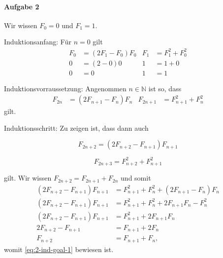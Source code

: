 \documentclass{article}
\begin{document}
\paragraph{Aufgabe 2}

Wir wissen $F_0 = 0$ und $F_1 = 1$.

Induktionsanfang: Für $n = 0$ gilt
\begin{align*}
    F_0 &= (2F_1 - F_0)F_0     & F_1 &= F^{2}_{1} + F^{2}_{0} \\
    0 &= (2 - 0)0              & 1 &= 1 + 0 \\
    0 &= 0                     & 1 &= 1
\end{align*}

Induktionsvorraussetzung: Angenommen $n \in \mathbb{N}$ ist so, dass
\begin{align*}
    F_{2n} &= (2F_{n + 1} - F_n)F_n & F_{2n + 1} &= F^{2}_{n + 1} + F^{2}_{n}
\end{align*}
gilt.

Induktionsschritt: Zu zeigen ist, dass dann auch

\begin{minipage}{.49\linewidth}
    \begin{equation}\label{eq:2-ind-goal-1}
        F_{2n + 2} = (2F_{n + 2} - F_{n + 1})F_{n + 1}
    \end{equation}
\end{minipage}%
\begin{minipage}{.49\linewidth}
    \begin{equation}\label{eq:2-ind-goal-2}
        F_{2n + 3} = F^{2}_{n + 2} + F^{2}_{n + 1}
    \end{equation}
\end{minipage}
\vspace{.5em}

gilt. Wir wissen $F_{2n + 2} = F_{2n + 1} + F_{2n}$ und somit
\begin{align*}
    (2F_{n + 2} - F_{n + 1})F_{n + 1} &= F^{2}_{n + 1} + F^{2}_{n} + (2F_{n + 1} - F_n)F_n \\
    (2F_{n + 2} - F_{n + 1})F_{n + 1} &= F^{2}_{n + 1} + F^{2}_{n} + 2F_{n + 1}F_n - F_{n}^{2} \\
    (2F_{n + 2} - F_{n + 1})F_{n + 1} &= F^{2}_{n + 1} + 2F_{n + 1}F_n \\
    2F_{n + 2} - F_{n + 1} &= F_{n + 1} + 2F_n \\
    F_{n + 2} &= F_{n + 1} + F_n,
\end{align*}
womit \eqref{eq:2-ind-goal-1} bewiesen ist.
\end{document}
